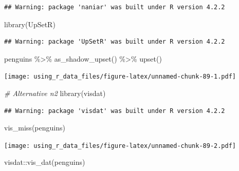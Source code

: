 \documentclass[
]{book}
\newenvironment{Shaded}{\begin{snugshade}}{\end{snugshade}}
\newcommand{\CommentTok}[1]{\textcolor[rgb]{0.56,0.35,0.01}{\textit{#1}}}
\newcommand{\FunctionTok}[1]{\textcolor[rgb]{0.00,0.00,0.00}{#1}}
\newcommand{\NormalTok}[1]{#1}
\newcommand{\SpecialCharTok}[1]{\textcolor[rgb]{0.00,0.00,0.00}{#1}}
\begin{document}
\begin{verbatim}
## Warning: package 'naniar' was built under R version 4.2.2
\end{verbatim}

\begin{Shaded}
\begin{Highlighting}[]
\FunctionTok{library}\NormalTok{(UpSetR)}
\end{Highlighting}
\end{Shaded}

\begin{verbatim}
## Warning: package 'UpSetR' was built under R version 4.2.2
\end{verbatim}

\begin{Shaded}
\begin{Highlighting}[]
\NormalTok{penguins }\SpecialCharTok{\%\textgreater{}\%} 
  \FunctionTok{as\_shadow\_upset}\NormalTok{() }\SpecialCharTok{\%\textgreater{}\%} 
  \FunctionTok{upset}\NormalTok{()}
\end{Highlighting}
\end{Shaded}

\texttt{[image: using\_r\_data\_files/figure-latex/unnamed-chunk-89-1.pdf]}

\begin{Shaded}
\begin{Highlighting}[]
\CommentTok{\# Alternative n2}
\FunctionTok{library}\NormalTok{(visdat)}
\end{Highlighting}
\end{Shaded}

\begin{verbatim}
## Warning: package 'visdat' was built under R version 4.2.2
\end{verbatim}

\begin{Shaded}
\begin{Highlighting}[]
\FunctionTok{vis\_miss}\NormalTok{(penguins)}
\end{Highlighting}
\end{Shaded}

\texttt{[image: using\_r\_data\_files/figure-latex/unnamed-chunk-89-2.pdf]}

\begin{Shaded}
\begin{Highlighting}[]
\NormalTok{visdat}\SpecialCharTok{::}\FunctionTok{vis\_dat}\NormalTok{(penguins)}
\end{Highlighting}
\end{Shaded}
\end{document}
